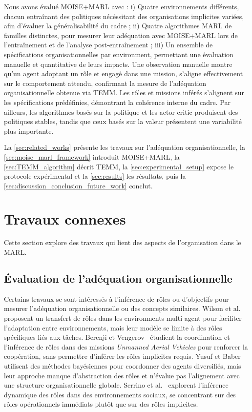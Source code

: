 \documentclass[dissemination]{jfsma}
\begin{document}
Nous avons évalué MOISE+MARL avec :
i) Quatre environnements différents, chacun entraînant des politiques nécéssitant des organisations implicites variées, afin d'évaluer la généralisabilité du cadre
 ; \quad
ii) Quatre algorithmes MARL de familles distinctes, pour mesurer leur adéquation avec MOISE+MARL lors de l'entraînement et de l'analyse post-entraînement
 ; \quad
iii) Un ensemble de spécifications organisationnelles par environment, permettant une évaluation manuelle et quantitative de leurs impacts.
%
Une observation manuelle montre qu'un agent adoptant un rôle et engagé dans une mission, s'aligne effectivement sur le comportement attendu, confirmant la mesure de l'adéquation organisationnelle obtenue via TEMM. Les rôles et missions inférés s'alignent sur les spécifications prédéfinies, démontrant la cohérence interne du cadre. Par ailleurs, les algorithmes basés sur la politique et les actor-critic produisent des politiques stables, tandis que ceux basés sur la valeur présentent une variabilité plus importante.


\noindent La \autoref{sec:related_works} présente les travaux sur l'adéquation organisationnelle, la \autoref{sec:moise_marl_framework} introduit MOISE+MARL, la \autoref{sec:TEMM_algorithm} décrit TEMM, la \autoref{sec:experimental_setup} expose le protocole expérimental et la \autoref{sec:results} les résultats, puis la \autoref{sec:discussion_conclusion_future_work} conclut.

\section{Travaux connexes}
\label{sec:related_works}

Cette section explore des travaux qui lient des aspects de l'organisation dans le MARL.

\subsection{Évaluation de l'adéquation organisationnelle}

Certains travaux se sont intéressés à l'inférence de rôles ou d'objectifs pour mesurer l'adéquation organisationnelle ou des concepts similaires.  
%
Wilson et al.~\cite{wilson2008learning} proposent un transfert de rôles dans les environments multi-agent pour faciliter l'adaptation entre environnements, mais leur modèle se limite à des rôles spécifiques liés aux tâches.  
%
Berenji et Vengerov~\cite{berenji2000learning} étudient la coordination et l'inférence de rôles dans des missions \textit{Unmanned Aerial Vehicles} pour renforcer la coopération, sans permettre d'inférer les rôles implicites requis.  
%
Yusuf et Baber~\cite{yusuf2020inferential} utilisent des méthodes bayésiennes pour coordonner des agents diversifiés, mais leur approche manque d'abstraction des rôles et n'évalue pas l'alignement avec une structure organisationnelle globale.
%
Serrino et al.~\cite{serrino2019finding} explorent l'inférence dynamique des rôles dans des environnements sociaux, se concentrant sur des rôles opérationnels immédiats plutôt que sur des rôles implicites.
\end{document}
